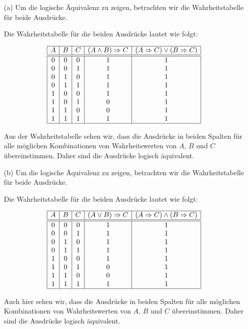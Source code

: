 \documentclass[%
    12pt,
    a4paper,
    ngerman,
    headheight=29.1pt,
]{scrartcl}
\begin{document}
\begin{enumerate}
    \item[(a)] Um die logische Äquivalenz zu zeigen, betrachten wir die Wahrheitstabelle für beide Ausdrücke.
    
    Die Wahrheitstabelle für die beiden Ausdrücke lautet wie folgt:
    
    \[
    \begin{array}{|c|c|c|c|c|}
    \hline
    A & B & C & (A \land B) \Rightarrow C & (A \Rightarrow C) \lor (B \Rightarrow C) \\
    \hline
    \hline
    0 & 0 & 0 & 1 & 1 \\
    0 & 0 & 1 & 1 & 1 \\
    0 & 1 & 0 & 1 & 1 \\
    0 & 1 & 1 & 1 & 1 \\
    1 & 0 & 0 & 1 & 1 \\
    1 & 0 & 1 & 0 & 1 \\
    1 & 1 & 0 & 0 & 1 \\
    1 & 1 & 1 & 1 & 1 \\
    \hline
    \end{array}
    \]
    
    Aus der Wahrheitstabelle sehen wir, dass die Ausdrücke in beiden Spalten für alle möglichen Kombinationen von Wahrheitswerten von \( A \), \( B \) und \( C \) übereinstimmen. Daher sind die Ausdrücke logisch äquivalent.
    
    \item[(b)] Um die logische Äquivalenz zu zeigen, betrachten wir die Wahrheitstabelle für beide Ausdrücke.
    
    Die Wahrheitstabelle für die beiden Ausdrücke lautet wie folgt:
    
    \[
    \begin{array}{|c|c|c|c|c|}
    \hline
    A & B & C & (A \lor B) \Rightarrow C & (A \Rightarrow C) \land (B \Rightarrow C) \\
    \hline
    \hline
    0 & 0 & 0 & 1 & 1 \\
    0 & 0 & 1 & 1 & 1 \\
    0 & 1 & 0 & 1 & 1 \\
    0 & 1 & 1 & 1 & 1 \\
    1 & 0 & 0 & 1 & 1 \\
    1 & 0 & 1 & 0 & 1 \\
    1 & 1 & 0 & 0 & 1 \\
    1 & 1 & 1 & 1 & 1 \\
    \hline
    \end{array}
    \]
    
    Auch hier sehen wir, dass die Ausdrücke in beiden Spalten für alle möglichen Kombinationen von Wahrheitswerten von \( A \), \( B \) und \( C \) übereinstimmen. Daher sind die Ausdrücke logisch äquivalent.
\end{enumerate}
\end{document}
